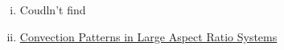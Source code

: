 \documentclass[12pt]{article}
\begin{document}
\begin{enumerate}[(i)]
        \item Coudln't find
        \item \href{https://pdf.sciencedirectassets.com/271587/1-s2.0-S0167278900X02618/1-s2.0-0167278984901817/main.pdf?X-Amz-Security-Token=IQoJb3JpZ2luX2VjEMv%2F%2F%2F%2F%2F%2F%2F%2F%2F%2FwEaCXVzLWVhc3QtMSJHMEUCIFmn1MWksKotrUDn9rAl9wFuqxQxWPXqeJNLQBxR43RlAiEA3YO5hTfwLg4CW0J1rEiSV86Q4mEyuLLNKhAkAoY%2BNMoq0gQIVBAFGgwwNTkwMDM1NDY4NjUiDJlU7OuYzIDkhpaNGyqvBPQNjLHRDeVhnmdDYqm1Uk32jB19%2FkE4rkeYfBVJggpPhRHzAZs39kHF1EXFfNhc431vrWHPyFkwTh1mCct7lN8nnF7Bf4Y16jG6cG5ggztxDja6eOcZI8QwlHTKj6AO%2F1fivVecjUsvYtyZYZPzJtx1yawzPP%2Fc9Xa4Hj238Zh%2F7nbT%2Bzvc7AYksLaSgHwJuswGIdU%2F8sQLlH%2Bh7o4la4DfKli6u0lBQD2GYPJUc%2BB2wJkLVfzO0ui7gf0he7lwMsi2KH5a0JoYkUG4AoiRdtK1mq2XsRPqwnvK34yjQQnNDR3COF1QuLDwB8VG4mdNK%2Frq1Fw0R%2BowIoswKlqzpSiuzP5mGNTecEPJ3RtC7m%2BjPnzpxXejJeetpMDUOIkGtNSlbYOXaIhaR%2F%2FpWbmANxSCZ4KApk5GxDSMIiTpRCXHjc4FnFH%2Fv0r8DslRvpgNvkx2NzpjfQRE%2FZBdgE53%2FdareeMqkMT4K%2BnkUIoi7T22z8b1%2BQG6w8T5dhjp3KOIMTklsaxT%2FJwaKBb2ufYRLpEpxMYjJj0VldYaBIp7YKMvz%2BgoGcPA%2BBeCrIKze08%2FEB%2FAvRQPlHi%2BcpLs9U1UK2Xi%2BKDM%2Fmtu9LisQlJi2XQiQAjY%2FcrMAYWmVqTb%2F5ETXshw5tUsL%2BUr843NMFIrUC3OwJ9nK0wQxkZvecFv%2BgK4rMCc1Gig%2Bc1HhyvA7d3%2FHNnM%2FM1ZzJyw7v%2FnKwLS6%2FDoJGqu9vJWrBAZhDvH04swuJm7mAY6qQE%2FMnt3h8GuV1h6CHDQKSmV%2BSpk0SbakzUaf3qLHJNqTvcsc8RTxdj0K6aOGjBrxWIcmPMdUtnhFEtvh%2FVagRlX2MAcK80OciCfuDp7LyLcHZEx%2FNDSl7pjZmaCn54f%2BvMJ3wxTDW3Stf%2BeSP5fN6fstjIWUhUK%2BbFzufU%2BRprzgyrVzc9ZEwP1bsoA1YHtFXW%2BEf9uVbnyHea70SjZkmhYY6UhKL1tqLwx&X-Amz-Algorithm=AWS4-HMAC-SHA256&X-Amz-Date=20220831T035907Z&X-Amz-SignedHeaders=host&X-Amz-Expires=300&X-Amz-Credential=ASIAQ3PHCVTY7GRAGZ45%2F20220831%2Fus-east-1%2Fs3%2Faws4_request&X-Amz-Signature=fc56a0f44faf3497a9fa217b944ac0032c45c1b9a6b9630463946ec1bf4d2eb4&hash=ac0e3fb5001803b343ad790bd374d1eb3a3b5de754fb1ad8fc5e090b14aff76f&host=68042c943591013ac2b2430a89b270f6af2c76d8dfd086a07176afe7c76c2c61&pii=0167278984901817&tid=spdf-07721bbc-be4d-4664-835c-54bf62ff820e&sid=f4108f064053494679698ac9f79c6b821331gxrqa&type=client&ua=4d54575502015e555306&rr=7432da070e74a6eb}{Convection Patterns in Large Aspect Ratio Systems}

\end{enumerate}
\end{document}

